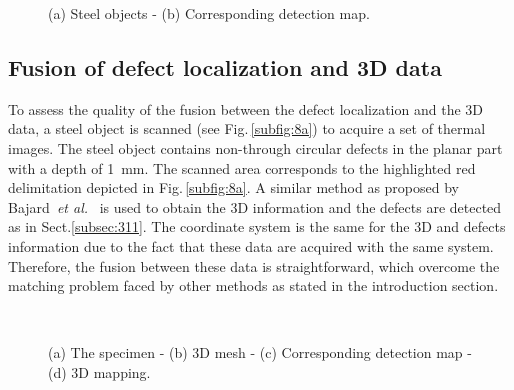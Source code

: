 \begin{figure}
  \centering
  \hspace*{\fill}
   \hfill
  \hspace*{\fill}
	\caption{(a) Steel objects - (b) Corresponding detection map.}
  \label{fig:7}
\end{figure}


\subsection{Fusion of defect localization and 3D data}

To assess the quality of the fusion between the defect localization and the 3D data, a steel object is scanned (see Fig.\,\ref{subfig:8a}) to acquire a set of thermal images.
The steel object contains non-through circular defects in the planar part with a depth of \SI{1}{\milli \metre}.
The scanned area corresponds to the highlighted red delimitation depicted in Fig.\,\ref{subfig:8a}.
A similar method as proposed by Bajard~\emph{et al.}~\cite{Bajard2012} is used to obtain the 3D information and the defects are detected as in Sect.\ref{subsec:311}.
The coordinate system is the same for the 3D and defects information due to the fact that these data are acquired with the same system.
Therefore, the fusion between these data is straightforward, which overcome the matching problem faced by other methods as stated in the introduction section.

\begin{figure}
  \centering
  \hspace*{\fill}
  \hfill
	\hspace*{\fill} \\ \hspace*{\fill}
   \hfill
  \hspace*{\fill}
  \caption{(a) The specimen - (b) 3D mesh - (c) Corresponding detection map - (d) 3D mapping.}
  \label{fig:8}
\end{figure}

